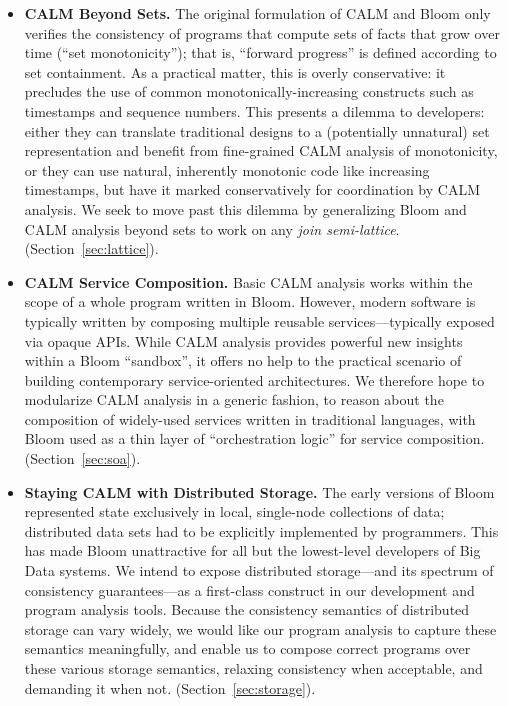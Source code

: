 \begin{itemize}
  \item \textbf{CALM Beyond Sets.}  The original formulation of CALM and Bloom only verifies the consistency of programs that compute sets of facts that grow over time (“set monotonicity”); that is, “forward progress” is defined according to set containment. As a practical matter, this is overly conservative: it precludes the use of common monotonically-increasing constructs such as timestamps and sequence numbers.  This presents a dilemma to developers: either they can translate traditional designs to a (potentially unnatural) set representation and benefit from fine-grained CALM analysis of monotonicity, or they can use natural, inherently monotonic code like increasing timestamps, but have it marked conservatively for coordination by CALM analysis.  We seek to move past this dilemma by generalizing Bloom and CALM analysis beyond sets to work on any \emph{join semi-lattice}.  (Section~\ref{sec:lattice}).

  \item \textbf{CALM Service Composition.}  Basic CALM analysis works within the scope of a whole program written in Bloom. However, modern software is typically written by composing multiple reusable services---typically exposed via opaque APIs. While CALM analysis provides powerful new insights within a Bloom ``sandbox'', it offers no help to the practical scenario of building contemporary service-oriented architectures.  We therefore hope to modularize CALM analysis in a generic fashion, to reason about the composition of widely-used services written in traditional languages, with Bloom used as a thin layer of ``orchestration logic'' for service composition.  (Section~\ref{sec:soa}).

  \item \textbf{Staying CALM with Distributed Storage.} The early versions of Bloom represented state exclusively in local, single-node collections of data; distributed data sets had to be explicitly implemented by programmers.  This has made Bloom unattractive for all but the lowest-level developers of Big Data systems.  We intend to expose distributed storage---and its spectrum of consistency guarantees---as a first-class construct in our development and program analysis tools.  Because the consistency semantics of distributed storage can vary widely, we would like our program analysis to capture these semantics meaningfully, and enable us to compose correct programs over these various storage semantics, relaxing consistency when acceptable, and demanding it when not.  (Section~\ref{sec:storage}).
  

\end{itemize}
